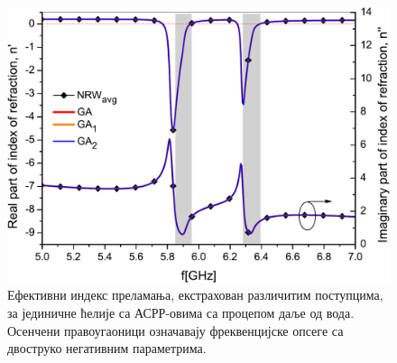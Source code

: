 \documentclass[main.tex]{subfiles}
\begin{document}
\begin{figure}[!t]
\centering
\includegraphics[scale=\SkalaB]{slike/8b.pdf}
\caption{Ефективни индекс преламања, екстрахован различитим поступцима, за јединичне ћелије са АСРР-овима са процепом даље од вода. Осенчени правоугаоници означавају фреквенцијске опсеге са двоструко негативним параметрима.}
\label{fig8b}
\end{figure} 
\end{document}
